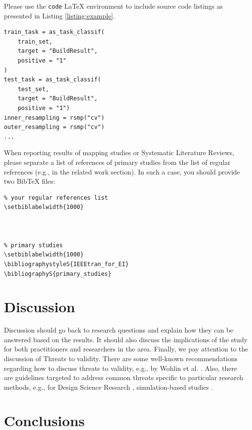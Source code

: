 \documentclass[]{einformatica}
\newenvironment{code}{\captionsetup{type=listing}}{}
\begin{document}
Please use the \texttt{code} LaTeX environment to include source code listings as presented in Listing \ref{listing:example}.

\begin{code}
\caption{R source code snippet for classif.ranger model creation and tuning with mlr3}
\label{listing:example}
\begin{verbatim}
train_task = as_task_classif(
    train_set,
    target = "BuildResult",
    positive = "1"
)
test_task = as_task_classif(
    test_set,
    target = "BuildResult",
    positive = "1")
inner_resampling = rsmp("cv")
outer_resampling = rsmp("cv")
...
\end{verbatim}
\end{code}

When reporting results of mapping studies or Systematic Literature Reviews, please separate a list of references of primary studies from the list of regular references (e.g., in the related work section). In such a case, you should provide two BibTeX files: \\

{\footnotesize
\begin{verbatim}
% your regular references list
\setbiblabelwidth{1000}
 


% primary studies
\setbiblabelwidth{1000}
\bibliographystyleS{IEEEtran_for_EI}
\bibliographyS{primary_studies}
\end{verbatim}
}

\section{Discussion}\label{sec:Discussion}

Discussion should go back to research questions and explain how they can be answered based on the results. It should also discuss the implications of the study for both practitioners and researchers in the area. Finally, we pay attention to the discussion of Threats to validity. There are some well-known recommendations regarding how to discuss threats to validity, e.g.,  by Wohlin et al. \cite{wohlin2012experimentation}. Also, there are guidelines targeted to address common threats specific to particular research methods, e.g., for Design Science Research \cite{Wieringa2014}, simulation-based studies \cite{bernard2015simulation}. 

\section{Conclusions}\label{sec:Conclusions}
\end{document}
